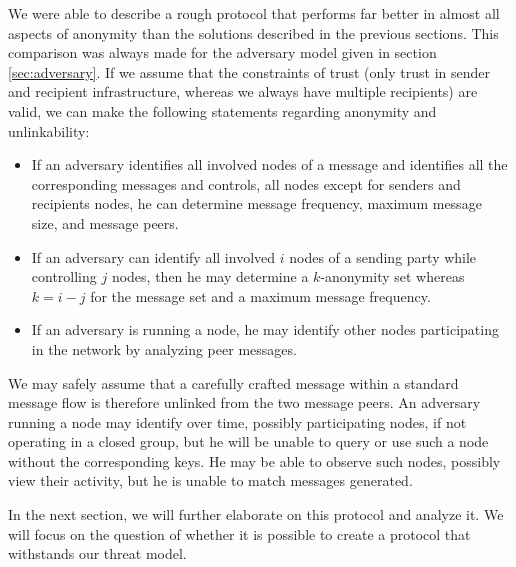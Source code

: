We were able to describe a rough protocol that performs far better in almost all aspects of anonymity than the solutions described in the previous sections. This comparison was always made for the adversary model given in section \ref{sec:adversary}. If we assume that the constraints of trust (only trust in sender and recipient infrastructure, whereas we always have multiple recipients) are valid, we can make the following statements regarding anonymity and unlinkability:
\begin{itemize}
	\item If an adversary identifies all involved nodes of a message and identifies all the corresponding messages and controls, all nodes except for senders and recipients nodes, he can determine message frequency, maximum message size, and message peers.
	\item If an adversary can identify all involved $i$ nodes of a sending party while controlling $j$ nodes, then he may determine a $k$-anonymity set whereas $k=i-j$ for the message set and a maximum message frequency. 
	\item If an adversary is running a node, he may identify other nodes participating in the network by analyzing peer messages.
\end{itemize}

We may safely assume that a carefully crafted message within a standard message flow is therefore unlinked from the two message peers. An adversary running a node may identify over time, possibly participating nodes, if not operating in a closed group, but he will be unable to query or use such a node without the corresponding keys. He may be able to observe such nodes, possibly view their activity, but he is unable to match messages generated.

In the next section, we will further elaborate on this protocol and analyze it. We will focus on the question of whether it is possible to create a protocol that withstands our threat model.

